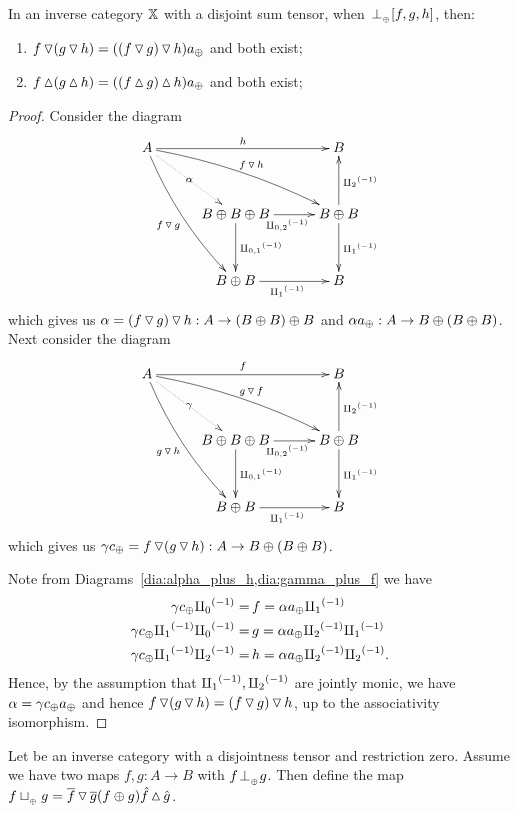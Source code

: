 \begin{lemma}\label{lem:tjdown_and_tjup_associate}
  In an inverse category $\mathbb{X}$ with a disjoint sum tensor, when ${}_{{}_{}}{\perp_{{}_{\oplus}}} [f,g,h]$, then:
  \begin{enumerate}
    \item   $f \operatorname{\triangledown} (g \operatorname{\triangledown} h) = ((f \operatorname{\triangledown} g) \operatorname{\triangledown} h) a_{\oplus}$ and both exist;
    \item   $f \operatorname{\vartriangle} (g \operatorname{\vartriangle} h) = ((f \operatorname{\vartriangle} g) \operatorname{\vartriangle} h) a_{\oplus}$ and both exist;
  \end{enumerate}
\end{lemma}
\begin{proof}
  Consider the diagram
  \begin{equation}
    \xymatrix@C+5pt@R+10pt{
      A \ar@/_/[ddr]_{f\tjdown g} \ar@/^/[drr]^{f\tjdown h} \ar@{.>}[dr]|-{\alpha} \ar[rr]^{h}
        & & B \\
        & B\+B\+B \ar[d]^{\icp{0,1}} \ar[r]_{\icp{0,2}} & B\+B \ar[d]^{\icpa} \ar[u]_{\icpb} \\
        & B\+B \ar[r]_{\icpa} & B
    }\label{dia:alpha_plus_h}
  \end{equation}
  which gives us $\alpha = (f \operatorname{\triangledown} g) \operatorname{\triangledown} h: A \to (B\oplus B)\oplus B$ and
  $\alpha a_{\oplus} :A \to B\oplus(B\oplus B)$. Next consider the diagram
  \begin{equation}
    \xymatrix@C+5pt@R+10pt{
      A \ar@/_/[ddr]_{g\tjdown h} \ar@/^/[drr]^{g\tjdown f} \ar@{.>}[dr]|-{\gamma} \ar[rr]^{f}
        & & B \\
        & B\+B\+B \ar[d]^{\icp{0,1}} \ar[r]_{\icp{0,2}} & B\+B \ar[d]^{\icpa} \ar[u]_{\icpb} \\
        & B\+B \ar[r]_{\icpa} & B
    }\label{dia:gamma_plus_f}
  \end{equation}
  which gives us $\gamma c_{\oplus} = f \operatorname{\triangledown} (g\operatorname{\triangledown} h): A \to B\oplus(B\oplus B)$.

  Note from Diagrams~\ref{dia:alpha_plus_h,dia:gamma_plus_f} we have
  \begin{align*}
    \gamma c_{\oplus}  {\amalg_{0}}^{(-1)}         =\, &f  = \alpha a_{\oplus}{\amalg_{1}}^{(-1)}\\
    \gamma c_{\oplus}  {\amalg_{1}}^{(-1)} {\amalg_{0}}^{(-1)} =\, &g  = \alpha a_{\oplus}{\amalg_{2}}^{(-1)}{\amalg_{1}}^{(-1)}\\
    \gamma c_{\oplus}  {\amalg_{1}}^{(-1)} {\amalg_{2}}^{(-1)}   =\, & h = \alpha a_{\oplus}{\amalg_{2}}^{(-1)}{\amalg_{2}}^{(-1)}.
  \end{align*}
  Hence, by the assumption that ${\amalg_{1}}^{(-1)}, {\amalg_{2}}^{(-1)}$ are jointly monic, we have
  $\alpha = \gamma c_{\oplus}  a_{\oplus}$ and hence $f \operatorname{\triangledown} (g \operatorname{\triangledown} h) = (f \operatorname{\triangledown} g) \operatorname{\triangledown} h$,
  up to the associativity isomorphism.
\end{proof}
\begin{definition}\label{def:tensor_disjoint_join}
  Let \X be an inverse category with a disjointness tensor and restriction zero. Assume we have two
  maps $f,g: A \to B$ with $f{}_{{}_{}}{\perp_{{}_{\oplus}}} g$. Then define the map $f \sqcup_{{_{\oplus}}} g = \overline{f}\operatorname{\triangledown}\overline{g}
  (f\oplus g) \hat{f}\operatorname{\vartriangle}\hat{g}$.
\end{definition}


